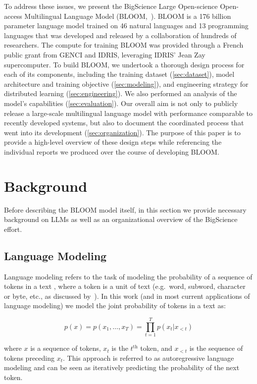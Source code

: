 To address these issues, we present the BigScience Large Open-science Open-access Multilingual Language Model (BLOOM,~\citealp{bloom_model}).
BLOOM is a 176 billion parameter language model trained on 46 natural languages and 13 programming languages that was developed and released by a collaboration of hundreds of researchers. The compute for training BLOOM was provided through a French public grant from GENCI and IDRIS, leveraging IDRIS' Jean Zay supercomputer. To build BLOOM, we undertook a thorough design process for each of its components, including the training dataset (\ref{sec:dataset}), model architecture and training objective (\ref{sec:modeling}), and engineering strategy for distributed learning (\ref{sec:engineering}).
We also performed an analysis of the model's capabilities (\ref{sec:evaluation}).
Our overall aim is not only to publicly release a large-scale multilingual language model with performance comparable to recently developed systems, but also to document the coordinated process that went into its development (\ref{sec:organization}).
The purpose of this paper is to provide a high-level overview of these design steps while referencing the individual reports we produced over the course of developing BLOOM.

\section{Background}
\label{sec:background}

Before describing the BLOOM model itself, in this section we provide necessary background on LLMs as well as an organizational overview of the BigScience effort.

\subsection{Language Modeling} Language modeling refers to the task of modeling the probability of a sequence of tokens in a text \citep{shannon1948mathematical}, where a token is a unit of text (e.g.\ word, subword, character or byte, etc., as discussed by~\citealp{mielke2021between}).
In this work (and in most current applications of language modeling) we model the joint probability of tokens in a text as:

\begin{equation}
    p(x) = p(x_1, \ldots, x_T) = \prod_{t = 1}^T p(x_t | x_{< t})
\end{equation}

where $x$ is a sequence of tokens, $x_t$ is the $t^{\mathrm{th}}$ token, and $x_{< t}$ is the sequence of tokens preceding $x_t$. This approach is referred to as autoregressive language modeling and can be seen as iteratively predicting the probability of the next token.

